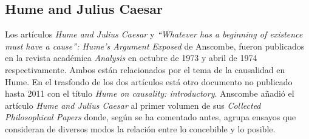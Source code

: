 \subsection{Hume and Julius Caesar}

Los artículos \emph{Hume and Julius Caesar} y \emph{``Whatever has a beginning of existence must have a cause'': Hume’s Argument Exposed} de Anscombe, fueron publicados en la revista académica \emph{Analysis} en octubre de 1973 y abril de 1974 respectivamente. Ambos están relacionados por el tema de la causalidad en Hume. En el trasfondo de los dos artículos está otro documento no publicado hasta 2011 con el título \emph{Hume on causality: introductory}. Anscombe añadió el artículo \emph{Hume and Julius Caesar} al primer volumen de sus \emph{Collected Philosophical Papers} donde, según se ha comentado antes, agrupa ensayos que consideran de diversos modos la relación entre lo concebible y lo posible.

